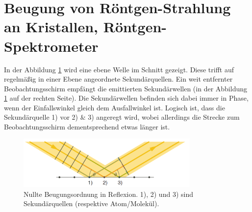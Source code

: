 \section{Beugung von Röntgen-Strahlung an Kristallen, Röntgen-Spektrometer}
In der Abbildung \ref{fig:imSchnittEbeneWelle} wird eine ebene Welle im Schnitt gezeigt. Diese trifft auf regelmäßig in einer Ebene angeordnete Sekundärquellen. Ein weit entfernter Beobachtungsschirm empfängt die emittierten Sekundärwellen (in der Abbildung \ref{fig:imSchnittEbeneWelle} auf der rechten Seite). Die Sekundärwellen befinden sich dabei immer in Phase, wenn der Einfallswinkel gleich dem Ausfallwinkel ist. Logisch ist, dass die Sekundärquelle 1) vor 2) $\&$ 3) angeregt wird, wobei allerdings die Strecke zum Beobachtungsschirm dementsprechend etwas länger ist.\\
\begin{figure}[h]
\centering
\includegraphics[width=0.8\textwidth]{Bilder/nullte_beugungsordnung_in_reflexion.png} 
\caption{Nullte Beugungsordnung in Reflexion. 1), 2) und 3) sind Sekundärquellen (respektive Atom/Molekül).}
\label{fig:imSchnittEbeneWelle}
\end{figure}
\newpage

